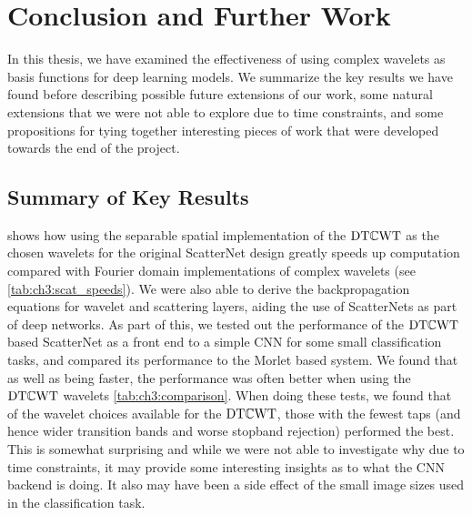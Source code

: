 \chapter{Conclusion and Further Work}\label{ch:conclusion}
\def \path {other/}
\def \imgpath {\path/images}

In this thesis, we have examined the effectiveness of using complex wavelets as
basis functions for deep learning models. We summarize the key results we have
found before describing possible future extensions of our work, some natural
extensions that we were not able to explore due to time constraints, and some
propositions for tying together interesting pieces of work that were developed 
towards the end of the project.


\section{Summary of Key Results}
\textbf{} shows how using the separable spatial implementation of 
the $\mathrm{DT}\mathbb{C}\mathrm{WT}$ as the chosen wavelets for the original ScatterNet design greatly
speeds up computation compared with Fourier domain implementations of complex
wavelets (see \autoref{tab:ch3:scat_speeds}). We were also able to
derive the backpropagation equations for wavelet and scattering layers, aiding
the use of ScatterNets as part of deep networks. As part of this, we tested out
the performance of the $\mathrm{DT}\mathbb{C}\mathrm{WT}$ based ScatterNet as a front end to a simple CNN for 
some small classification tasks, and compared its performance to the Morlet based system. We
found that as well as being faster, the performance was often better when using
the $\mathrm{DT}\mathbb{C}\mathrm{WT}$ wavelets \autoref{tab:ch3:comparison}. When doing these tests, we
found that of the wavelet choices available for the $\mathrm{DT}\mathbb{C}\mathrm{WT}$, those with the
fewest taps (and hence wider transition bands and worse stopband rejection)
performed the best. This is somewhat surprising and while we were not able to
investigate why due to time constraints, it may provide some interesting
insights as to what the CNN backend is doing. It also may have been a side
effect of the small image sizes used in the classification task.

